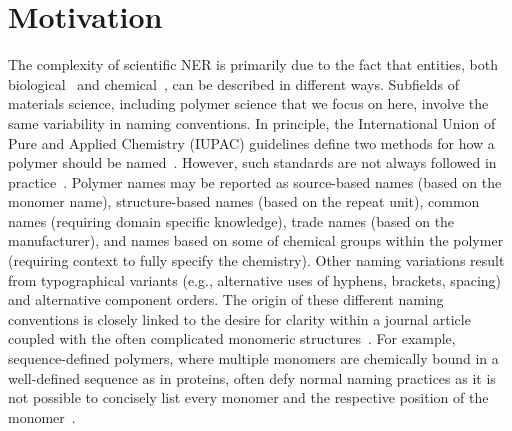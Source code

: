 \section{Motivation}
\label{sect:background}
The complexity of scientific NER is primarily due to the fact that entities,
both biological~\cite{kim2004introduction} and chemical~\cite{krallinger2015chemdner}, can be described in different ways. 
Subfields of materials science, including polymer science that we focus on here, involve the same variability in naming conventions.
In principle, the International Union of Pure and Applied Chemistry (IUPAC) guidelines define two 
methods for how a polymer should be named~\cite{hiorns2013brief}.
However, such standards are not always followed in practice~\cite{tamames2006success}.
Polymer names may be reported as source-based names (based on the monomer name), structure-based names (based on the repeat unit), common names (requiring domain specific knowledge), trade names (based on the manufacturer), and names based on some of chemical groups within the polymer (requiring context to fully specify the chemistry).
Other naming variations result from typographical variants (e.g., alternative uses of hyphens, brackets, spacing) and alternative component orders.
The origin of these different naming conventions is closely linked to the desire for clarity within a journal article coupled with the often complicated monomeric structures~\cite{audus2017polymer}.
For example, sequence-defined polymers, where multiple monomers are chemically bound in a well-defined sequence as in proteins, often defy normal naming practices as it is not possible to concisely list every monomer and the respective position of the monomer~\cite{lutz2014polymer}. 

